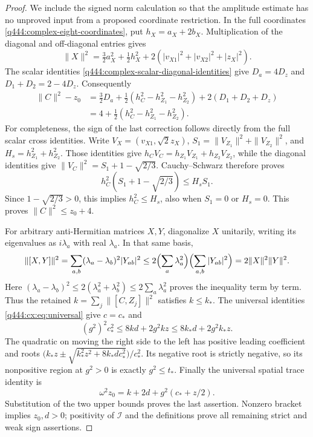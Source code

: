 \begin{proof}
We include the signed norm calculation so that the amplitude estimate has
no unproved input from a proposed coordinate restriction. In the full
coordinates \eqref{q444:complex-eight-coordinates}, put $h_X=a_X+2b_X$.
Multiplication of the diagonal and off-diagonal entries gives
\[
 \|X\|^2=\tfrac32a_X^2+\tfrac12h_X^2
       +2(|v_{X1}|^2+|v_{X2}|^2+|z_X|^2).
\]
The scalar identities
\eqref{q444:complex-scalar-diagonal-identities} give
$D_a=4D_z$ and $D_1+D_2=2-4D_z$. Consequently
\begin{align*}
 \|C\|^2-z_0
 &=\tfrac32D_a+\tfrac12(h_C^2-h_{Z_1}^2-h_{Z_2}^2)
                    +2(D_1+D_2+D_z)\\
 &=4+\tfrac12(h_C^2-h_{Z_1}^2-h_{Z_2}^2).
\end{align*}
For completeness, the sign of the last correction follows directly from
the full scalar cross identities. Write
$V_X=(v_{X1},\sqrt2 z_X)$,
$S_1=\|V_{Z_1}\|^2+\|V_{Z_2}\|^2$, and
$H_s=h_{Z_1}^2+h_{Z_2}^2$. Those identities give
$h_C V_C=h_{Z_1}V_{Z_1}+h_{Z_2}V_{Z_2}$, while the diagonal identities
give $\|V_C\|^2=S_1+1-\sqrt{2/3}$.
Cauchy--Schwarz therefore proves
\[
 h_C^2(S_1+1-\sqrt{2/3})\le H_s S_1.
\]
Since $1-\sqrt{2/3}>0$, this implies $h_C^2\le H_s$, also when
$S_1=0$ or $H_s=0$. This proves $\|C\|^2\le z_0+4$.

For arbitrary anti-Hermitian matrices $X,Y$, diagonalize $X$ unitarily,
writing its eigenvalues as $i\lambda_a$ with real $\lambda_a$.
In that same basis,
\[
 \|[X,Y]\|^2
 =\sum_{a,b}(\lambda_a-\lambda_b)^2|Y_{ab}|^2
 \le2\Bigl(\sum_a\lambda_a^2\Bigr)
               \Bigl(\sum_{a,b}|Y_{ab}|^2\Bigr)
 =2\|X\|^2\|Y\|^2.
\]
Here $(\lambda_a-\lambda_b)^2\le2(\lambda_a^2+\lambda_b^2)
\le2\sum_a\lambda_a^2$ proves the inequality term by term.
Thus the retained $k=\sum_j\|[C,Z_j]\|^2$ satisfies $k\le k_*$.
The universal identities \eqref{q444:cx:eq:universal} give
$c=c_*$ and
\[
 (g^2)^2c_*^2\le8kd+2g^2kz
                    \le8k_*d+2g^2k_*z.
\]
The quadratic on moving the right side to the left has positive leading
coefficient and roots
$\bigl(k_*z\pm\sqrt{k_*^2z^2+8k_*d c_*^2}\bigr)/c_*^2$.
Its negative root is strictly negative, so its nonpositive region at
$g^2>0$ is exactly $g^2\le t_*$. Finally the universal spatial trace
identity is
\[
 \omega^2z_0=k+2d+g^2(c_*+z/2).
\]
Substitution of the two upper bounds proves the last assertion.
Nonzero bracket implies $z_0,d>0$; positivity of $\mathcal I$ and the
definitions prove all remaining strict and weak sign assertions.
\end{proof}

